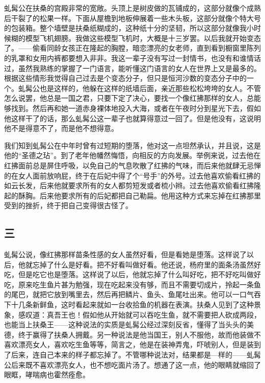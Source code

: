 虬髯公在扶桑的宫殿非常的宽敞。头顶上是树皮做的瓦铺成的，这部分就像个成熟后干裂了的松果一样。下面从屋檐到地板伸展着一些木头板，这部分就像个特大号的包装箱。整个墙壁是扶桑纸糊成的，这种纸十分的坚韧，所以这部分就像我小时候糊的模型飞机翅膀。我做这些模型飞机时，大概是十三岁罢。以后我就开始变态了。——偷看同龄女孩正在隆起的胸膛，暗恋漂亮的女老师，直到看到橱窗里陈列的乳罩和女用内裤都要想入非非。我这一辈子没有写过一封情书，也没有和谁情话过，虽然我熟练的掌握了一门语言，能听懂这门语言的女人在世界上又是最多的。根据这些情形我觉得自己过去是个变态分子，但只是恒河沙数的变态分子中的一个。虬髯公也是这样的，他躲在这样的纸墙后面，亲近那些松松垮垮的女人。不管怎么说罢，他总是一国之君，只要下定了决心，要找一个像红拂那样的女人，总能够找到。然后再和她一道赤身裸体地投入大海，或者在午夜时分到星光下去，假如他这样干了的话，那么虬髯公这一辈子也就算得意过一回了。但是他没有，这说明他不是得意不了，而是他不想得意。 

我们知到虬髯公在中年时曾有过短期的堕落，他对这一点坦然承认，并且说，这是他的“圣德之玷”。到了老年他幡然悔悟，向相反的方向发展。举例来说，过去他在红拂面前总是屏住呼吸，以免自己的气息吹散了红拂的气味，而后来他就肆无忌惮的在女人面前放响屁，终于在后妃中得了个“号手”的外号。过去他喜欢偷看红拂的如云长发，后来他就要求所有的女人都剪短发或者梳小辫。过去他喜欢偷看红拂隆起的酥胸。后来他要求所有的后妃都把自己勒扁。他用这种方式来忘掉在红拂那里受到的挫折，终于把自己变得很古怪了。 

\subsection{三} 

虬髯公说，像红拂那样苗条性感的女人虽然好看，但是看她是堕落。这样说了以后，他就忘掉了什么是好看。把不好看叫做好看。他还说，杨府里的面条汤虽然好吃，但是吃它也是堕落。这样说了以后，他就忘掉了什么叫好吃，把不好吃叫做好吃，原来吃生鱼片甚为勉强，现在吃起来没有够，而且不需要切成片，拎起一条鱼的尾巴，就把它放到嘴里去，然后再把鳞片、鱼头、鱼尾吐出来。他可以一口气吞下十几条新鲜鱼，这时看起来就如一台收拾鱼的机器在表演。扶桑人见到了这种景象，感叹道：真吾王也！假如他从开始就可以吞吃生鱼，就不需要把人砍成两段，也能当上扶桑王——这种说法的实质是虬髯公经过深刻反省，懂得了当头头的美德，终于赢得了扶桑人拥戴。另一种说法是他当国王，别人不服他，故而他装做不喜欢漂亮女人，喜欢吃生鱼等等，简言之，他是在装神弄鬼，吓唬别人，但是装到了后来，连自己本来的样子都忘掉了。不管哪种说法对，结果都是—样的——虬髯公后来既不喜欢漂亮女人，也不想吃面片汤了。想通了这一点，他的眼睛就缩回了眼眶，哮喘病也霍然痊愈。 

